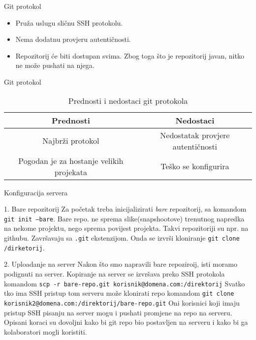 \documentclass[10pt]{beamer}
\begin{document}
	\begin{frame}{Git protokol}
		\begin{itemize}
			\item Pruža uslugu sličnu SSH protokolu.
			\item Nema dodatnu provjeru autentičnosti.
			\item Repozitorij će biti dostupan svima.
			Zbog toga što je repozitorij javan, nitko ne može pushati na njega.
		\end{itemize}
	\end{frame}

	\begin{frame}{Git protokol}
		\begin{table}
			\caption{Prednosti i nedostaci git protokola}
			\begin{tabular}{||c|c||}
				\hline
				\textbf{Prednosti} & \textbf{Nedostaci} \\ \hline
				Najbrži protokol & Nedostatak provjere autentičnosti \\
				Pogodan je za hostanje velikih projekata & Teško se konfigurira\\  
				\hline
			\end{tabular}
		\end{table}
	\end{frame}

	\begin{frame}
		\color{blue}
		\centering
		\huge Konfiguracija servera
	\end{frame}

	\begin{frame}{1. Bare repozitorij}
		Za početak treba inicijalizirati \textit{bare} repozitorij, sa komandom \texttt{ git init --bare}. \newline
		Bare repo. ne sprema slike(snapshootove) trenutnog napredka na nekome projektu, nego sprema povijest projekta. \newline
		Takvi repozitoriji su npr. na githubu. Završavaju sa \texttt{.git} ekstenzijom. Onda se izvrši kloniranje \texttt{git clone /dirketorij}.
	\end{frame}

	\begin{frame}{2. Uploadanje na server}
		Nakon što smo napravili bare repoziroij, isti moramo podignuti na server. \newline
		Kopiranje na server se izvršava preko SSH protokola komandom \texttt{scp -r bare-repo.git korisnik@domena.com:/direktorij} \newline
		Svatko tko ima SSH pristup tom serveru može klonirati repo komandom \texttt{git clone korisnik2@domena.com:/direktorij/bare-repo.git}\newline
		Oni korisnici koji imaju pristup SSH pisanju na server mogu i pushati promjene na repo na serveru.
		\newline 
		Opisani koraci su dovoljni kako bi git repo bio postavljen na serveru i kako bi ga kolaboratori mogli koristiti. 
	\end{frame}
\end{document}

